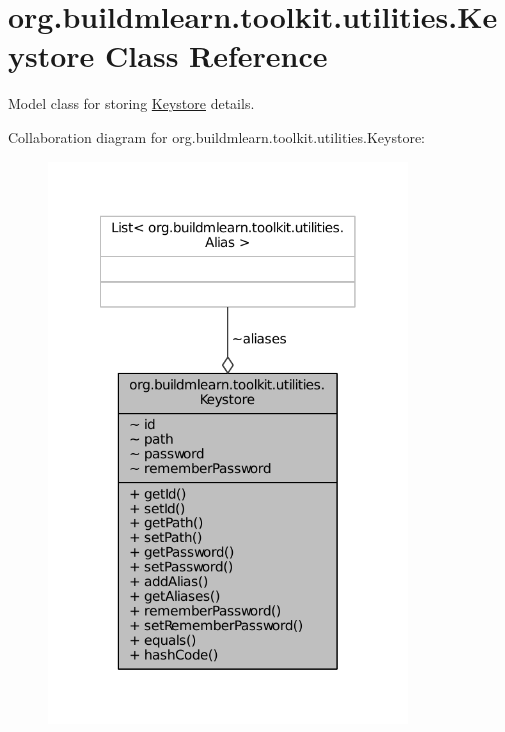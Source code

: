 \hypertarget{classorg_1_1buildmlearn_1_1toolkit_1_1utilities_1_1Keystore}{\section{org.\-buildmlearn.\-toolkit.\-utilities.\-Keystore Class Reference}
\label{classorg_1_1buildmlearn_1_1toolkit_1_1utilities_1_1Keystore}
}


Model class for storing \hyperlink{classorg_1_1buildmlearn_1_1toolkit_1_1utilities_1_1Keystore}{Keystore} details.  




Collaboration diagram for org.\-buildmlearn.\-toolkit.\-utilities.\-Keystore\-:
\nopagebreak
\begin{figure}[H]
\begin{center}
\leavevmode
\includegraphics[width=270pt]{d5/d16/classorg_1_1buildmlearn_1_1toolkit_1_1utilities_1_1Keystore__coll__graph}
\end{center}
\end{figure}
